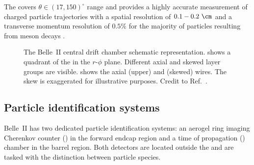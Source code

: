 The \CDC covers $\theta\in(17,150)^{\circ}$ range and provides a highly accurate measurement of charged particle trajectories with a spatial resolution of $0.1-0.2~\cm$
and a transverse momentum resolution of $0.5\%$ for the majority of particles resulting from \B meson decays \cite{Kandra:2019qlz}.

\begin{figure}[htbp!]
    \centering
    \caption{\label{fig:cdc}
    The Belle~II central drift chamber schematic representation.
     shows a quadrant of the \CDC in the $r$-$\phi$ plane.
    Different axial and skewed layer groups are visible.
     shows the axial (upper) and (skewed) wires.
    The skew is exaggerated for illustrative purposes.
    Credit to Ref.~\cite{BelleIITrackingGroup:2020hpx}.
    }
\end{figure}

\subsection{Particle identification systems}\label{sec:pid}

Belle~II has two dedicated particle identification systems: an aerogel ring imaging Cherenkov counter (\ARICH) in the forward endcap region
and a time of propagation (\TOP) chamber in the barrel region. 
Both detectors are located outside the \CDC and are tasked with the distinction between particle species.

